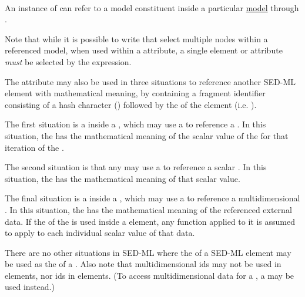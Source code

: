 \paragraph*{}
\label{sec:target}
An instance of \Variable can refer to a model constituent inside a particular \hyperref[class:model]{model} through . 

Note that while it is possible to write  that select multiple nodes within a referenced model, when used within a  attribute, a single element or attribute \emph{must} be selected by the expression.

\begin{blockChanged}
The  attribute may also be used in three situations to reference another SED-ML element with mathematical meaning, by containing a fragment identifier consisting of a hash character (\code{\#}) followed by the \SId of the element (i.e. ).

The first situation is a \Variable inside a \RepeatedTask, which may use a  to reference a \Range.  In this situation, the \Variable has the mathematical meaning of the scalar value of the \Range for that iteration of the \RepeatedTask.

The second situation is that any \Variable may use a  to reference a scalar \DataSource.  In this situation, the \Variable has the mathematical meaning of that scalar value.

The final situation is a \Variable inside a \DataGenerator, which may use a  to reference a multidimensional \DataSource.  In this situation, the \Variable has the mathematical meaning of the referenced external data.  If the  of the \Variable is used inside a \Math element, any function applied to it is assumed to apply to each individual scalar value of that data.

There are no other situations in SED-ML where the  of a SED-ML element may be used as the  of a \Variable.  Also note that multidimensional \DataSource ids may not be used in \RepeatedTask elements, nor \Range ids in \DataGenerator elements.  (To access multidimensional data for a \Range, a \DataRange may be used instead.)
\end{blockChanged}

